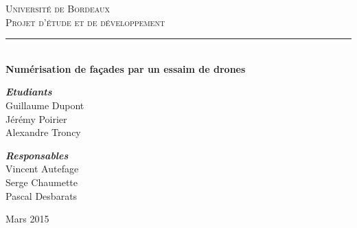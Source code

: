 \documentclass[12pt, openany]{report}
\newcommand{\HRule}{\rule{\linewidth}{0.5mm}}
\begin{document}
\lstset{language=Java}
\begin{titlepage}
  \begin{sffamily}
  \begin{center}


 	
    \textsc{\LARGE Université de Bordeaux}\\[3cm]

    \textsc{\Large Projet d'étude et de développement}\\[2.5cm]

    \HRule \\[1.5cm]
    { \huge \bfseries Numérisation de façades par un essaim de drones\\[0.4cm] }

	
    \vspace{10 cm}
    
    \begin{minipage}{0.4\textwidth}
      \begin{flushleft} \large
      \emph{\textbf{Etudiants}}\\Guillaume Dupont\\Jérémy Poirier\\Alexandre Troncy
      \end{flushleft}
    \end{minipage}
    \begin{minipage}{0.4\textwidth}
      \begin{flushright} \large
        \emph{\textbf{Responsables}}\\Vincent Autefage\\Serge Chaumette\\Pascal Desbarats
      \end{flushright}
    \end{minipage}

    \vfill

    {\large Mars 2015}

  \end{center}
  \end{sffamily}
\end{titlepage}
\newpage
\tableofcontents
\begin{center}
\end{center}
\newpage
\end{document}
